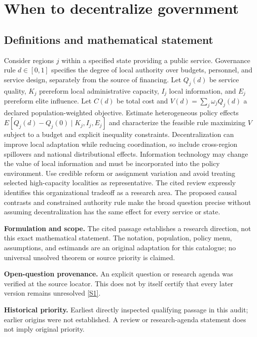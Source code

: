 \documentclass[11pt]{article}
\newcommand{\sref}[2]{\hyperlink{source:#1:#2}{[S#2]}}
\begin{document}
\section*{When to decentralize government}\label{30007668}
\subsection{Definitions and mathematical statement}
Consider regions \(j\) within a specified state providing a public service. Governance rule \(d\in[0,1]\) specifies the degree of local authority over budgets, personnel, and service design, separately from the source of financing. Let \(Q_j(d)\) be service quality, \(K_j\) prereform local administrative capacity, \(I_j\) local information, and \(E_j\) prereform elite influence. Let \(C(d)\) be total cost and \(V(d)=\sum_j\omega_jQ_j(d)\) a declared population-weighted objective. Estimate heterogeneous policy effects \(E[Q_j(d)-Q_j(0)\mid K_j,I_j,E_j]\) and characterize the feasible rule maximizing \(V\) subject to a budget and explicit inequality constraints. Decentralization can improve local adaptation while reducing coordination, so include cross-region spillovers and national distributional effects. Information technology may change the value of local information and must be incorporated into the policy environment. Use credible reform or assignment variation and avoid treating selected high-capacity localities as representative. The cited review expressly identifies this organizational tradeoff as a research area. The proposed causal contrasts and constrained authority rule make the broad question precise without assuming decentralization has the same effect for every service or state.

\par\textbf{Formulation and scope.} The cited passage establishes a research direction, not this exact mathematical statement. The notation, population, policy menu, assumptions, and estimands are an original adaptation for this catalogue; no universal unsolved theorem or source priority is claimed.

\par\textbf{Open-question provenance.} An explicit question or research agenda was verified at the source locator. This does not by itself certify that every later version remains unresolved \sref{30007668}{1}.

\par\textbf{Historical priority.} Earliest directly inspected qualifying passage in this audit; earlier origins were not established. A review or research-agenda statement does not imply original priority.
\end{document}
